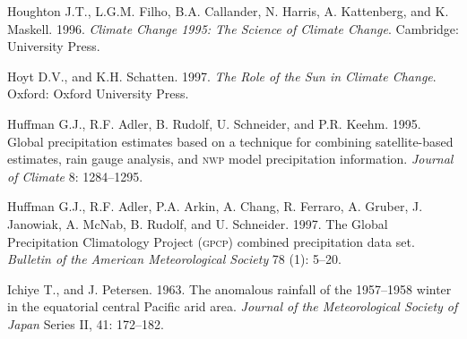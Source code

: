 \begin{thebibliography}{999}
Houghton J.T., L.G.M. Filho, B.A. Callander, N. Harris, A. Kattenberg,
and K. Maskell. 1996. \textit{Climate Change 1995: The Science of
  Climate Change}. Cambridge: University Press.
%

Hoyt D.V., and K.H. Schatten.  1997. \textit{The Role of the Sun in
  Climate Change}.  Oxford: Oxford University Press.
%

Huffman G.J., R.F. Adler, B. Rudolf, U. Schneider, and
P.R. Keehm. 1995.  Global precipitation estimates based on a technique
for combining satellite-based estimates, rain gauge analysis, and
\textsc{nwp} model precipitation information. \textit{Journal of
  Climate} 8: 1284--1295.
%

Huffman G.J., R.F. Adler, P.A. Arkin, A. Chang, R. Ferraro, A. Gruber,
J.  Janowiak, A. McNab, B. Rudolf, and U. Schneider. 1997. The Global
Precipitation Climatology Project (\textsc{gpcp}) combined
precipitation data set.  \textit{Bulletin of the American
  Meteorological Society} 78 (1): 5--20.
%

Ichiye T., and J. Petersen.  1963. The anomalous rainfall of the
1957--1958 winter in the equatorial central Pacific arid
area. \textit{Journal of the Meteorological Society of Japan} Series
II, 41: 172--182.
%


\end{thebibliography}
